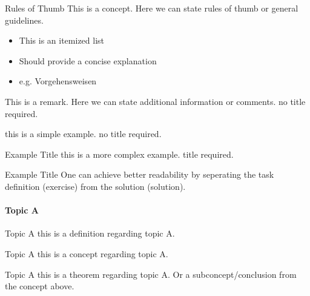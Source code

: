\begin{theorem}{Rules of Thumb}
    This is a concept. Here we can state rules of thumb or general guidelines.
    \begin{itemize}
        \item This is an itemized list
        \item Should provide a concise explanation
        \item e.g. Vorgehensweisen
    \end{itemize}
\end{theorem}

\begin{remark}
    This is a remark. Here we can state additional information or comments. no title required.
\end{remark}

\begin{example}
    this is a simple example. no title required.
\end{example}

\begin{example2}{Example Title}
    this is a more complex example. title required.
\end{example2}

\begin{example2}{Example Title}
    One can achieve better readability by seperating the task definition (exercise)
    \tcblower
    from the solution (solution).
\end{example2}

\paragraph{Topic A}


\begin{definition}{Topic A}
    this is a definition regarding topic A.
\end{definition}

\begin{concept}{Topic A}
    this is a concept regarding topic A.
\end{concept}

\begin{theorem}{Topic A}
    this is a theorem regarding topic A. Or a subconcept/conclusion from the concept above.
\end{theorem}

